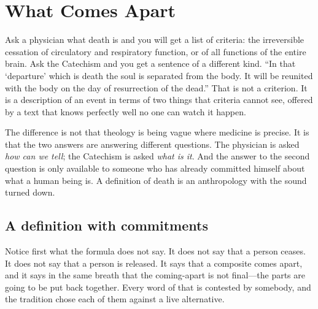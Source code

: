 \section{What Comes Apart}

Ask a physician what death is and you will get a list of criteria: the irreversible cessation of circulatory and respiratory function, or of all functions of the entire brain. Ask the Catechism and you get a sentence of a different kind. ``In that `departure' which is death the soul is separated from the body. It will be reunited with the body on the day of resurrection of the dead.'' That is not a criterion. It is a description of an event in terms of two things that criteria cannot see, offered by a text that knows perfectly well no one can watch it happen.

The difference is not that theology is being vague where medicine is precise. It is that the two answers are answering different questions. The physician is asked \emph{how can we tell}; the Catechism is asked \emph{what is it}. And the answer to the second question is only available to someone who has already committed himself about what a human being is. A definition of death is an anthropology with the sound turned down.

\subsection{A definition with commitments}

Notice first what the formula does not say. It does not say that a person ceases. It does not say that a person is released. It says that a composite comes apart, and it says in the same breath that the coming-apart is not final---the parts are going to be put back together. Every word of that is contested by somebody, and the tradition chose each of them against a live alternative.

